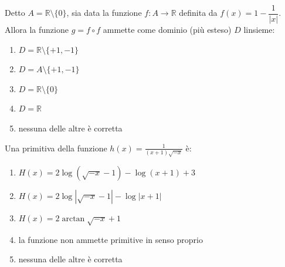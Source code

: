 \begin{quiz}
Detto $A=\mathbb R\setminus\{0\}$, sia data la funzione $f:A\to\mathbb R$ definita da $f(x)=1-\dfrac1{|x|}$. Allora la funzione $g=f\circ f$ ammette come dominio (pi\`u esteso) $D$ l\textquotesingle insieme:
\begin{enumerate}
\item $D=\mathbb R\setminus\{+1,-1\}$
\item $D=A\setminus\{+1,-1\}$
\item $D=\mathbb R\setminus\{0\}$
\item $D=\mathbb R$
\item nessuna delle altre \`e corretta
\end{enumerate}
\end{quiz}

\begin{quiz}
Una primitiva della funzione $\displaystyle h(x)=\frac{1}{(x+1)\sqrt{-x}}$ \`e:
\begin{enumerate}
\item $H(x)=2\log(\sqrt{-x}-1)-\log(x+1)+3$
\item $H(x)=2\log|\sqrt{-x}-1|-\log|x+1|$
\item $H(x)=2\arctan\sqrt{-x}+1$
\item la funzione non ammette primitive in senso proprio
\item nessuna delle altre \`e corretta
\end{enumerate}
\end{quiz}

